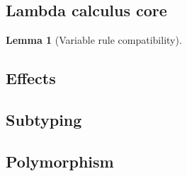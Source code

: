 \documentclass[a4paper, 12pt]{report}
\newcommand{\+}{\enspace}
\newtheorem{lemma}{Lemma}
\begin{document}
\subsection{Lambda calculus core}

\begin{lemma}[Variable rule compatibility]
\end{lemma}

\subsection{Effects}

\subsection{Subtyping}

\subsection{Polymorphism}





\end{document}
